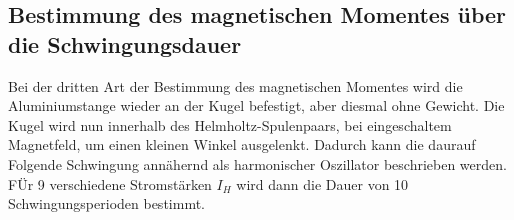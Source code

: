 \subsection{Bestimmung des magnetischen Momentes über die Schwingungsdauer}
Bei der dritten Art der Bestimmung des magnetischen Momentes wird die Aluminiumstange wieder an der Kugel befestigt, aber diesmal ohne Gewicht.
Die Kugel wird nun innerhalb des Helmholtz-Spulenpaars, bei eingeschaltem Magnetfeld, um einen kleinen Winkel ausgelenkt.
Dadurch kann die daurauf Folgende Schwingung annähernd als harmonischer Oszillator beschrieben werden.
FÜr 9 verschiedene Stromstärken $I_H$ wird dann die Dauer von 10 Schwingungsperioden bestimmt.